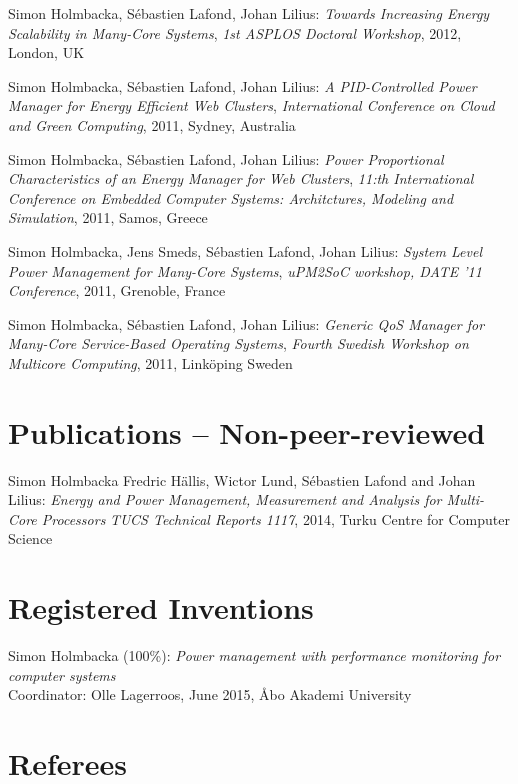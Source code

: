 \documentclass[margin,line]{resume}
\begin{document}
\begin{resume}
Simon Holmbacka, S\'{e}bastien Lafond, Johan Lilius: 
\textit{Towards Increasing Energy Scalability in Many-Core Systems}, 
\textsl{1st ASPLOS Doctoral Workshop}, 2012, London, UK

Simon Holmbacka, S\'{e}bastien Lafond, Johan Lilius: 
\textit{A PID-Controlled Power Manager for Energy Efficient Web Clusters}, 
\textsl{International Conference on Cloud and Green Computing}, 2011, Sydney, Australia 

Simon Holmbacka, S\'{e}bastien Lafond, Johan Lilius: 
\textit{Power Proportional Characteristics of an Energy Manager for Web Clusters}, 
\textsl{11:th International Conference on Embedded Computer Systems: Architctures, Modeling and Simulation}, 2011, Samos, Greece

Simon Holmbacka, Jens Smeds, S\'{e}bastien Lafond, Johan Lilius:
\textit{System Level Power Management for Many-Core Systems},
\textsl{uPM2SoC workshop, DATE '11 Conference}, 2011, Grenoble, France

Simon Holmbacka, S\'{e}bastien Lafond, Johan Lilius: 
\textit{Generic QoS Manager for Many-Core Service-Based Operating Systems}, 
\textsl{Fourth Swedish Workshop on Multicore Computing}, 2011, Link\"{o}ping Sweden
\clearpage
\section{\mysidestyle Publications -- Non-peer-reviewed}
Simon Holmbacka Fredric H\"{a}llis, Wictor Lund, S\'{e}bastien Lafond and Johan Lilius:
\textit{Energy and Power Management, Measurement and Analysis for Multi-Core Processors} 
\textsl{TUCS Technical Reports 1117}, 2014, Turku Centre for Computer Science 

\section{\mysidestyle Registered Inventions}
Simon Holmbacka (100\%):
\textit{Power management with performance monitoring for computer systems}\\Coordinator: Olle Lagerroos, June 2015, \AA{}bo Akademi University
\section{\mysidestyle Referees} 


\end{resume}
\end{document}
